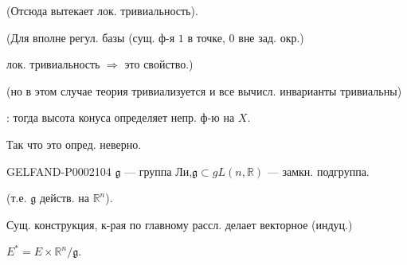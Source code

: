 (Отсюда вытекает лок. тривиальность).



(Для вполне регул. базы (сущ. ф-я $1$ в точке, $0$ вне зад. окр.)



лок. тривиальность $\Longrightarrow$ это свойство.)



(но в этом случае теория тривиализуется и все вычисл. инварианты тривиальны)



\begin{center}\end{center}



: тогда высота конуса определяет непр. ф-ю на $X$.



Так что это опред. неверно.



\begin{center}\end{center}



\begin{GelfandAdjacentEvidence}{GELFAND-P000210}{4}
$\mathfrak g$ --- группа Ли,\quad$\mathfrak g\subset gL(n,\mathbb R)$ --- замкн. подгруппа.
\end{GelfandAdjacentEvidence}

(т.е. $\mathfrak g$ действ. на $\mathbb R^n$).



Сущ. конструкция, к-рая по главному рассл. делает векторное (индуц.)



$E^*=E\times\mathbb R^n/\mathfrak g$.



